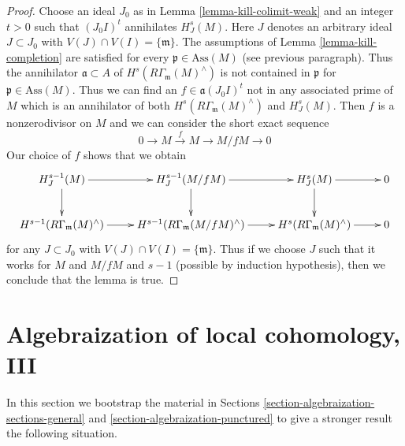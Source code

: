 \documentclass{stacks-project}
\theoremstyle{plain}
\theoremstyle{definition}
\theoremstyle{remark}
\numberwithin{equation}{subsection}
\begin{document}
\begin{proof}
\medskip\noindent
Choose an ideal $J_0$ as in Lemma \ref{lemma-kill-colimit-weak}
and an integer $t > 0$ such that $(J_0I)^t$ annihilates $H^s_J(M)$.
Here $J$ denotes an arbitrary ideal $J \subset J_0$ with
$V(J) \cap V(I) = \{\mathfrak m\}$.
The assumptions of Lemma \ref{lemma-kill-completion}
are satisfied for every $\mathfrak p \in \text{Ass}(M)$
(see previous paragraph). Thus the annihilator $\mathfrak a \subset A$ of
$H^s(R\Gamma_\mathfrak m(M)^\wedge)$
is not contained in $\mathfrak p$ for $\mathfrak p \in \text{Ass}(M)$.
Thus we can find an $f \in \mathfrak a(J_0I)^t$
not in any associated prime of $M$ which is an annihilator
of both $H^s(R\Gamma_\mathfrak m(M)^\wedge)$ and $H^s_J(M)$.
Then $f$ is a nonzerodivisor on $M$ and we can consider the
short exact sequence
$$
0 \to M \xrightarrow{f} M \to M/fM \to 0
$$
Our choice of $f$ shows that we obtain
$$
\xymatrix{
H^{s - 1}_J(M) \ar[d] \ar[r] &
H^{s - 1}_J(M/fM) \ar[d] \ar[r] &
H^s_J(M) \ar[d] \ar[r] & 0 \\
H^{s - 1}(R\Gamma_\mathfrak m(M)^\wedge) \ar[r] &
H^{s - 1}(R\Gamma_\mathfrak m(M/fM)^\wedge) \ar[r] &
H^s(R\Gamma_\mathfrak m(M)^\wedge) \ar[r] & 0
}
$$
for any $J \subset J_0$ with $V(J) \cap V(I) = \{\mathfrak m\}$.
Thus if we choose $J$ such that it works for
$M$ and $M/fM$ and $s - 1$ (possible by induction hypothesis),
then we conclude that the lemma is true.
\end{proof}








\section{Algebraization of local cohomology, III}
\label{section-bootstrap}

\noindent
In this section we bootstrap the material in
Sections \ref{section-algebraization-sections-general} and
\ref{section-algebraization-punctured}
to give a stronger result the following situation.
\end{document}
